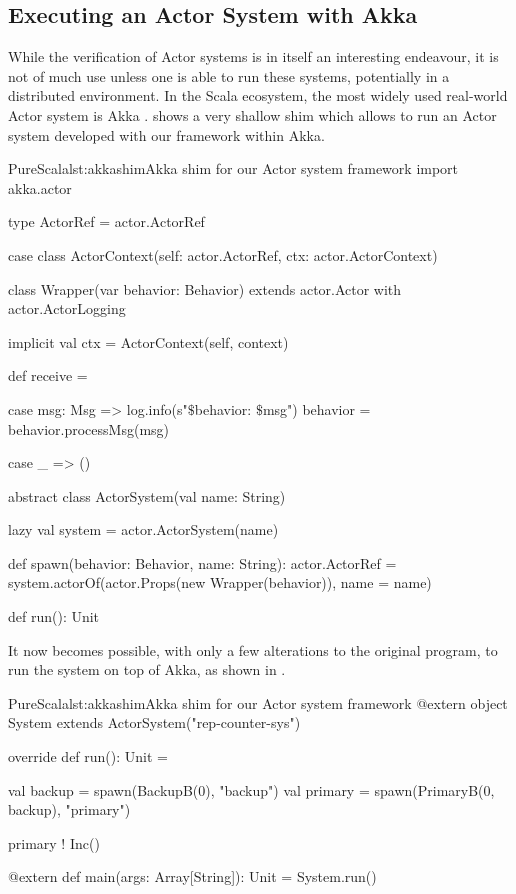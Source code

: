 \subsection{Executing an Actor System with Akka}
\label{akka}

While the verification of Actor systems is in itself an interesting endeavour, it is not of much use unless one is able to run these systems, potentially in a distributed environment. In the Scala ecosystem, the most widely used real-world Actor system is Akka .  shows a very shallow shim which allows to run an Actor system developed with our framework within Akka.

\begin{Code}{PureScala}{lst:akkashim}{Akka shim for our Actor system framework}
import akka.actor

type ActorRef = actor.ActorRef

case class ActorContext(self: actor.ActorRef, ctx: actor.ActorContext)

class Wrapper(var behavior: Behavior)
  extends actor.Actor with actor.ActorLogging {

  implicit val ctx = ActorContext(self, context)

  def receive = {
    case msg: Msg =>
      log.info(s"$\$${behavior}: $\$${msg}")
      behavior = behavior.processMsg(msg)

    case _ => ()
  }
}

abstract class ActorSystem(val name: String) {
  lazy val system = actor.ActorSystem(name)

  def spawn(behavior: Behavior, name: String): actor.ActorRef = {
    system.actorOf(actor.Props(new Wrapper(behavior)), name = name)
  }

  def run(): Unit
}
\end{Code}


It now becomes possible, with only a few alterations to the original program, to run the system on top of Akka, as shown in .

\begin{Code}{PureScala}{lst:akkashim}{Akka shim for our Actor system framework}
@extern
object System extends ActorSystem("rep-counter-sys") {
  override def run(): Unit = {
    val backup  = spawn(BackupB(0), "backup")
    val primary = spawn(PrimaryB(0, backup), "primary")

    primary ! Inc()
  }
}

@extern
def main(args: Array[String]): Unit = {
  System.run()
}
\end{Code}

